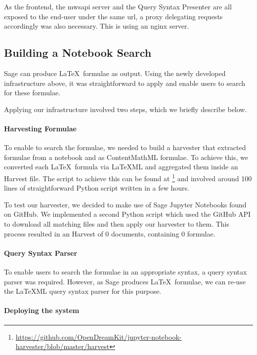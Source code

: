 As the frontend, the mwsapi server and the Query Syntax Presenter are all exposed to the end-user under the same url, a proxy delegating requests accordingly was also necessary. 
This is using an nginx server. 

\subsection{Building a Notebook Search}

Sage can produce \LaTeX\ formulae as output.
Using the newly developed infrastructure above, it was straightforward to apply \MWS and enable users to search for these formulae. 

Applying our infrastructure involved two steps, which we briefly describe below.

\paragraph{Harvesting Formulae}
To enable \MWS to search the formulae, we needed to build a harvester that extracted formulae from a notebook and as ContentMathML formulae. 
To achieve this, we converted each \LaTeX\ formula via LaTeXML and aggregated them inside an \MWS Harvest file. 
The script to achieve this can be found at \footnote{\url{https://github.com/OpenDreamKit/jupyter-notebook-harvester/blob/master/harvest}} and involved around 100 lines of straightforward Python script written in a few hours. 

To test our harvester, we decided to make use of Sage Jupyter Notebooks found on GitHub. 
We implemented a second Python script which used the GitHub API to download all matching files and then apply our harvester to them. 
This process resulted in an \MWS Harvest of $0$ documents, containing $0$ formulae.

\paragraph{Query Syntax Parser}

To enable users to search the formulae in an appropriate syntax, a query syntax parser was required. 
However, as Sage produces \LaTeX\ formulae, we can re-use the {\LaTeX}ML query syntax parser for this purpose. 

\paragraph{Deploying the system}

